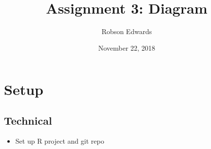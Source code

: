 \documentclass[11pt, oneside]{article}
\title{Assignment 3: Diagram}
\author{Robson Edwards}
\date{November 22, 2018}							%
\begin{document}
\maketitle

\section{Setup}
\subsection{Technical}
\begin{itemize}
	\item Set up R project and git repo
\end{itemize}
\end{document}

